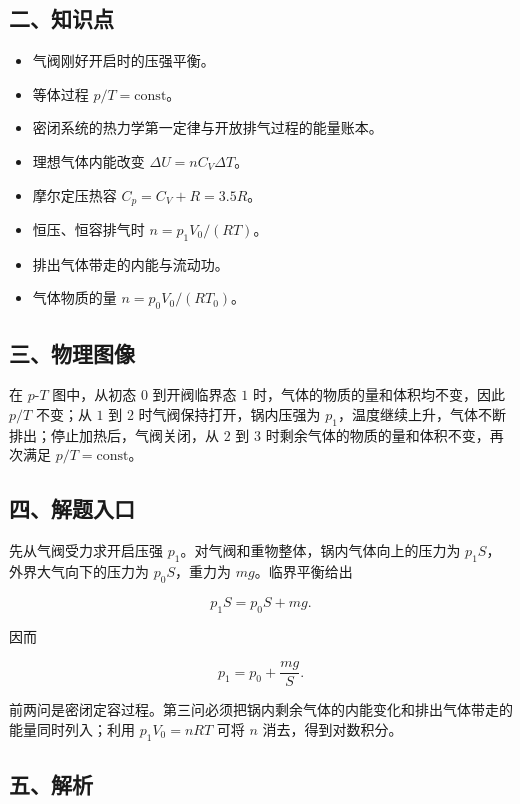 \documentclass[12pt,a4paper,UTF8]{ctexart}
\newcommand{\tightlist}{\setlength{\itemsep}{0pt}\setlength{\parskip}{0pt}}
\begin{document}
\subsection{二、知识点}\label{ux4e8cux77e5ux8bc6ux70b9-5}

\begin{itemize}
\tightlist
\item
  气阀刚好开启时的压强平衡。
\item
  等体过程 \(p/T=\text{const}\)。
\item
  密闭系统的热力学第一定律与开放排气过程的能量账本。
\item
  理想气体内能改变 \(\Delta U=nC_V\Delta T\)。
\item
  摩尔定压热容 \(C_p=C_V+R=3.5R\)。
\item
  恒压、恒容排气时 \(n=p_1V_0/(RT)\)。
\item
  排出气体带走的内能与流动功。
\item
  气体物质的量 \(n=p_0V_0/(RT_0)\)。
\end{itemize}

\subsection{三、物理图像}\label{ux4e09ux7269ux7406ux56feux50cf-5}

在 \(p\)-\(T\) 图中，从初态 \(0\) 到开阀临界态 \(1\)
时，气体的物质的量和体积均不变，因此 \(p/T\) 不变；从 \(1\) 到 \(2\)
时气阀保持打开，锅内压强为
\(p_1\)，温度继续上升，气体不断排出；停止加热后，气阀关闭，从 \(2\) 到
\(3\) 时剩余气体的物质的量和体积不变，再次满足 \(p/T=\text{const}\)。

\subsection{四、解题入口}\label{ux56dbux89e3ux9898ux5165ux53e3-5}

先从气阀受力求开启压强 \(p_1\)。对气阀和重物整体，锅内气体向上的压力为
\(p_1S\)，外界大气向下的压力为 \(p_0S\)，重力为 \(mg\)。临界平衡给出

\[p_1S=p_0S+mg.\]

因而

\[p_1=p_0+\frac{mg}{S}.\]

前两问是密闭定容过程。第三问必须把锅内剩余气体的内能变化和排出气体带走的能量同时列入；利用
\(p_1V_0=nRT\) 可将 \(n\) 消去，得到对数积分。

\subsection{五、解析}\label{ux4e94ux89e3ux6790-5}
\end{document}
